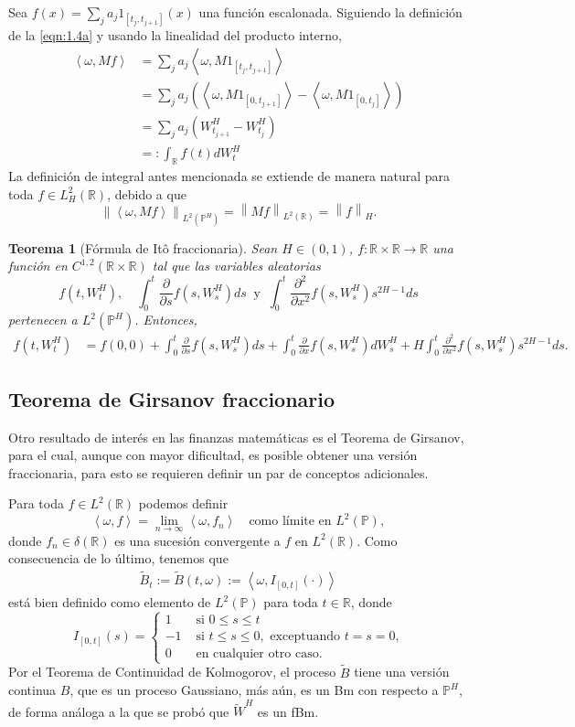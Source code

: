\documentclass[letterpaper,12pt,oneside]{book}
\theoremstyle{plain}
\newtheorem{theorem}{Teorema}[section]
\numberwithin{theorem}{section}
\begin{document}
Sea $f(x)=\sum_j a_j 1_{[t_j,t_{j+1}]}(x)$ una función escalonada. Siguiendo la definición de la \cref{eqn:1.4a} y usando la linealidad del producto interno,
\begin{align}\label{eqn:1.5a}
	\left<\omega,Mf\right>&=\sum_j a_j\left<\omega,M1_{[t_j,t_{j+1}]}\right>\nonumber\\
				&=\sum_j a_j\left(\left<\omega,M1_{[0,t_{j+1}]}\right>-\left<\omega,M1_{[0,t_{j}]}\right>\right)\nonumber\\
				&=\sum_j a_j\left(W^H_{t_{j+1}}-W^H_{t_j}\right)\nonumber\\
				&=:\int_{\mathbb R}f(t)dW^H_t
\end{align}
La definición de integral antes mencionada se extiende de manera natural para toda $f\in L^2_{H}(\mathbb R)$, debido a que
$$\left\|\left<\omega,Mf\right>\right\|_{L^2(\mathbb P^H)}=\left\|Mf\right\|_{L^2(\mathbb R)}=\left\|f\right\|_H.$$
\begin{theorem}[Fórmula de Itô fraccionaria]
	Sean $H\in(0,1)$, $f:\mathbb R\times \mathbb R\rightarrow \mathbb R$ una función en $C^{1,2}(\mathbb R\times \mathbb R)$ tal que las variables aleatorias
	$$f(t,W^H_t),\quad \int_0^t \frac{\partial}{\partial s}f(s,W^H_s)ds\:\text{ y }\:\int_0^t\frac{\partial^2}{\partial x^2}f(s,W^H_s)s^{2H-1}ds$$
	pertenecen a $L^2(\mathbb P^H)$. Entonces,
	\begin{align}
		f(t,W^H_t)&=f(0,0)+\int_0^t \frac{\partial}{\partial s}f(s,W^H_s)ds+\int_0^t \frac{\partial}{\partial x}f(s,W^H_s)dW^H_s+H\int_0^t \frac{\partial^2}{\partial x^2}f(s,W^H_s)s^{2H-1}ds.
	\end{align}
\end{theorem}
\subsection{Teorema de Girsanov fraccionario}
Otro resultado de interés en las finanzas matemáticas es el Teorema de Girsanov, para el cual, aunque con mayor dificultad, es posible obtener una versión fraccionaria, para esto se requieren definir un par de conceptos adicionales.

Para toda $f\in L^2(\mathbb R)$ podemos definir
$$\left<\omega,f\right>=\lim_{n\rightarrow\infty}\left<\omega,f_n\right> \quad	\text{como límite en }L^2(\mathbb P),$$
donde $f_n\in \delta(\mathbb R)$ es una sucesión convergente a $f$ en $L^2(\mathbb R)$. Como consecuencia de lo último, tenemos que
\begin{align}\label{eqn:1.6}
	\tilde B_t:=\tilde B(t, \omega):=\left<\omega, I_{[0,t]}(\cdot)\right>
\end{align}
está bien definido como elemento de $L^2(\mathbb P)$ para toda $t\in \mathbb R$, donde
$$I_{[0,t]}(s)=\left\{
	\begin{matrix}
		1&\text{ si }0\leq s\leq t\\
		-1&\text{ si }t\leq s\leq 0,\text{ exceptuando $t=s=0$,}\\
		0&\text{ en cualquier otro caso.}
	\end{matrix}
\right.$$
Por el Teorema de Continuidad de Kolmogorov, el proceso $\tilde B$ tiene una versión continua $B$, que es un proceso Gaussiano, más aún, es un Bm con respecto a $\mathbb P^H$, de forma análoga a la que se probó que $\tilde W^H$ es un fBm.
\end{document}
